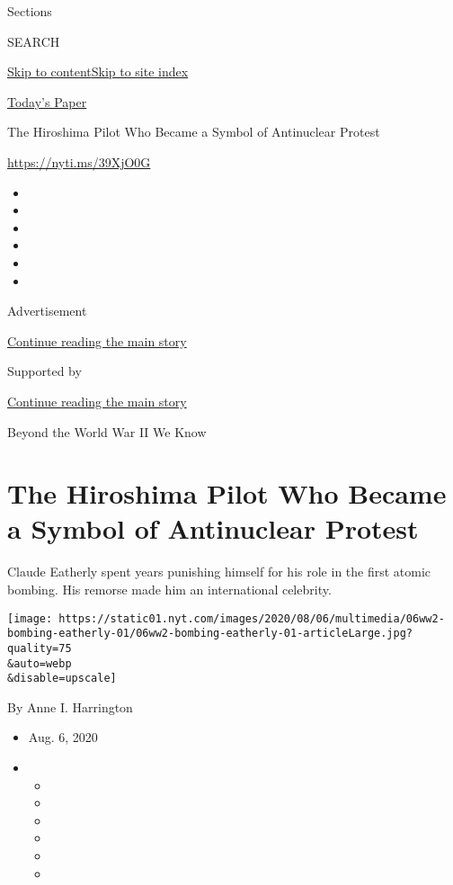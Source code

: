 Sections

SEARCH

\protect\hyperlink{site-content}{Skip to
content}\protect\hyperlink{site-index}{Skip to site index}

\href{https://myaccount.nytimes.com/auth/login?response_type=cookie\&client_id=vi}{}

\href{https://www.nytimes.com/section/todayspaper}{Today's Paper}

The Hiroshima Pilot Who Became a Symbol of Antinuclear Protest

\href{https://nyti.ms/39XjO0G}{https://nyti.ms/39XjO0G}

\begin{itemize}
\item
\item
\item
\item
\item
\item
\end{itemize}

Advertisement

\protect\hyperlink{after-top}{Continue reading the main story}

Supported by

\protect\hyperlink{after-sponsor}{Continue reading the main story}

Beyond the World War II We Know

\hypertarget{the-hiroshima-pilot-who-became-a-symbol-of-antinuclear-protest}{%
\section{The Hiroshima Pilot Who Became a Symbol of Antinuclear
Protest}\label{the-hiroshima-pilot-who-became-a-symbol-of-antinuclear-protest}}

Claude Eatherly spent years punishing himself for his role in the first
atomic bombing. His remorse made him an international celebrity.

\texttt{[image: https://static01.nyt.com/images/2020/08/06/multimedia/06ww2-bombing-eatherly-01/06ww2-bombing-eatherly-01-articleLarge.jpg?quality=75\\\&auto=webp\\\&disable=upscale]}

By Anne I. Harrington

\begin{itemize}
\item
  Aug. 6, 2020
\item
  \begin{itemize}
  \item
  \item
  \item
  \item
  \item
  \item
  \end{itemize}
\end{itemize}

